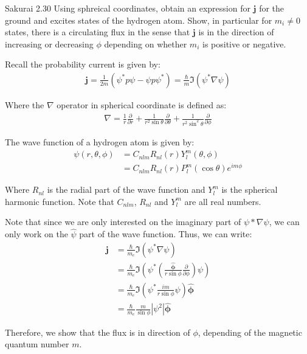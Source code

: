 \documentclass{article}
\newcommand{\bs}{\boldsymbol}
\begin{document}
\newpage
\begin{section}{Sakurai 2.30}
Using sphreical coordinates, obtain an expression for $\bs{j}$ for the ground and excites states of the hydrogen atom. Show, in particular for $m_i \neq 0$ states, there is a circulating flux in the sense that $\bs{j}$ is in the direction of increasing or decreasing $\phi$ depending on whether $m_i$ is positive or negative.

\begin{tcolorbox}[breakable]
	Recall the probability current is given by:
	\begin{align*}
		\bs{j} = \frac{1}{2m} (\psi^*p\psi - \psi p\psi^*) = \frac{\hbar}{m} \Im(\psi^* \nabla \psi)
	\end{align*}

	Where the $\nabla$ operator in spherical coordinate is defined as:
	\begin{align*}
		\nabla = \frac{1}{r} \frac{\partial}{\partial r} + \frac{1}{r^2 \sin \theta} \frac{\partial}{\partial \theta} + \frac{1}{r^2 \sin^2 \theta} \frac{\partial}{\partial \phi}
	\end{align*}

	The wave function of a hydrogen atom is given by:
	\begin{align*}
		\psi(r, \theta, \phi) & = C_{nlm} R_{nl}(r) Y_l^m(\theta, \phi)           \\
		                      & = C_{nlm} R_{nl}(r) P_l^m(\cos \theta) e^{im\phi}
	\end{align*}

	Where $R_{nl}$ is the radial part of the wave function and $Y_l^m$ is the spherical harmonic function. Note that $C_{nlm}$, $R_{nl}$ and $Y_l^m$ are all real numbers.

	Note that since we are only interested on the imaginary part of $\psi* \nabla \psi$, we can only work on the $\hat{\psi}$ part of the wave function. Thus, we can write:
	\begin{align*}
		\bs{j} & = \frac{\hbar}{m_e} \Im(\psi^* \nabla \psi)                                                                            \\
		       & = \frac{\hbar}{m_e} \Im(\psi^* \left( \frac{\bs{\hat{\phi}}}{r \sin \phi} \frac{\partial}{\partial \phi} \right) \psi) \\
		       & = \frac{\hbar}{m_e} \Im(\psi^* \frac{i m}{r \sin \phi} \psi) \bs{\hat{\phi}}                                           \\
		       & = \frac{\hbar}{m_e} \frac{m}{\sin \phi} |\psi^2| \bs{\hat{\phi}}
	\end{align*}

	Therefore, we show that the flux is in direction of $\phi$, depending of the magnetic quantum number $m$.
\end{tcolorbox}
\end{section}
\end{document}
